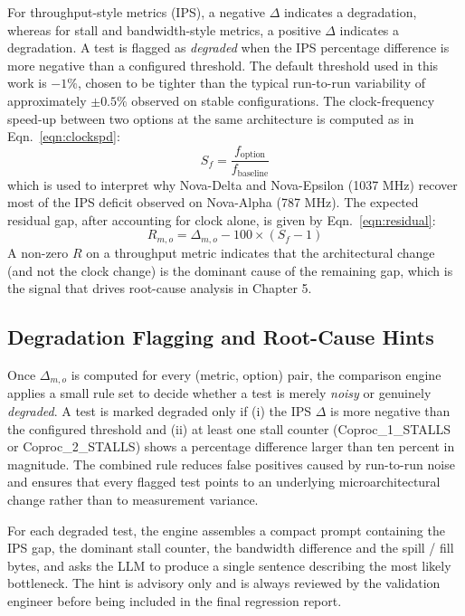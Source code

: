 For throughput-style metrics (IPS), a negative \(\Delta\) indicates a degradation, whereas for stall and bandwidth-style metrics, a positive \(\Delta\) indicates a degradation. A test is flagged as \textit{degraded} when the IPS percentage difference is more negative than a configured threshold. The default threshold used in this work is \(-1\%\), chosen to be tighter than the typical run-to-run variability of approximately \(\pm 0.5\%\) observed on stable configurations. The clock-frequency speed-up between two options at the same architecture is computed as in Eqn.\ \ref{eqn:clockspd}:
\begin{equation}
\label{eqn:clockspd}
S_{f} = \frac{f_{\text{option}}}{f_{\text{baseline}}}
\end{equation}
which is used to interpret why Nova-Delta and Nova-Epsilon (1037 MHz) recover most of the IPS deficit observed on Nova-Alpha (787 MHz). The expected residual gap, after accounting for clock alone, is given by Eqn.\ \ref{eqn:residual}:
\begin{equation}
\label{eqn:residual}
R_{m,o} = \Delta_{m,o} - 100 \times \left( S_f - 1 \right)
\end{equation}
A non-zero \(R\) on a throughput metric indicates that the architectural change (and not the clock change) is the dominant cause of the remaining gap, which is the signal that drives root-cause analysis in Chapter 5.

\subsection{Degradation Flagging and Root-Cause Hints}
Once \(\Delta_{m,o}\) is computed for every (metric, option) pair, the comparison engine applies a small rule set to decide whether a test is merely \textit{noisy} or genuinely \textit{degraded}. A test is marked degraded only if (i) the IPS \(\Delta\) is more negative than the configured threshold and (ii) at least one stall counter (Coproc\_1\_STALLS or Coproc\_2\_STALLS) shows a percentage difference larger than ten percent in magnitude. The combined rule reduces false positives caused by run-to-run noise and ensures that every flagged test points to an underlying microarchitectural change rather than to measurement variance.

For each degraded test, the engine assembles a compact prompt containing the IPS gap, the dominant stall counter, the bandwidth difference and the spill / fill bytes, and asks the LLM to produce a single sentence describing the most likely bottleneck. The hint is advisory only and is always reviewed by the validation engineer before being included in the final regression report.


